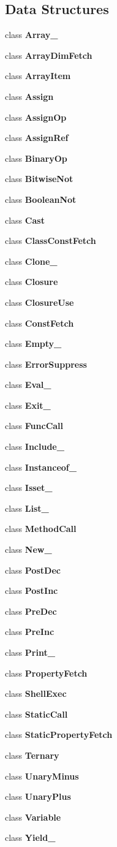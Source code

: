 \subsection*{Data Structures}
\begin{DoxyCompactItemize}
\item 
class {\bf Array\+\_\+}
\item 
class {\bf Array\+Dim\+Fetch}
\item 
class {\bf Array\+Item}
\item 
class {\bf Assign}
\item 
class {\bf Assign\+Op}
\item 
class {\bf Assign\+Ref}
\item 
class {\bf Binary\+Op}
\item 
class {\bf Bitwise\+Not}
\item 
class {\bf Boolean\+Not}
\item 
class {\bf Cast}
\item 
class {\bf Class\+Const\+Fetch}
\item 
class {\bf Clone\+\_\+}
\item 
class {\bf Closure}
\item 
class {\bf Closure\+Use}
\item 
class {\bf Const\+Fetch}
\item 
class {\bf Empty\+\_\+}
\item 
class {\bf Error\+Suppress}
\item 
class {\bf Eval\+\_\+}
\item 
class {\bf Exit\+\_\+}
\item 
class {\bf Func\+Call}
\item 
class {\bf Include\+\_\+}
\item 
class {\bf Instanceof\+\_\+}
\item 
class {\bf Isset\+\_\+}
\item 
class {\bf List\+\_\+}
\item 
class {\bf Method\+Call}
\item 
class {\bf New\+\_\+}
\item 
class {\bf Post\+Dec}
\item 
class {\bf Post\+Inc}
\item 
class {\bf Pre\+Dec}
\item 
class {\bf Pre\+Inc}
\item 
class {\bf Print\+\_\+}
\item 
class {\bf Property\+Fetch}
\item 
class {\bf Shell\+Exec}
\item 
class {\bf Static\+Call}
\item 
class {\bf Static\+Property\+Fetch}
\item 
class {\bf Ternary}
\item 
class {\bf Unary\+Minus}
\item 
class {\bf Unary\+Plus}
\item 
class {\bf Variable}
\item 
class {\bf Yield\+\_\+}
\end{DoxyCompactItemize}
